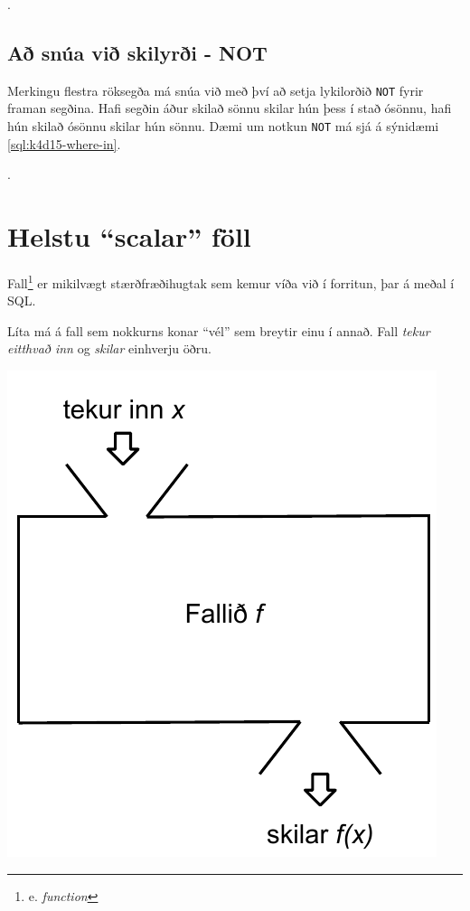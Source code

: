 \begin{example}
\caption[WHERE með IN]{Tvær \emph{SELECT} skipanir sem gera sama hlutinn. Þær finna báðar nemendurna með númerin 1, 3, 5 og 7. Seinni skipunin er þó töluvert skárri!}
\label{sql:k4d15-where-in}.
\centering
{}
\end{example}
\subsection{Að snúa við skilyrði - NOT}
Merkingu flestra röksegða má snúa við með því að setja lykilorðið \verb|NOT| fyrir framan segðina. Hafi segðin áður skilað sönnu skilar hún þess í stað ósönnu, hafi hún skilað ósönnu skilar hún sönnu. Dæmi um notkun \verb|NOT| má sjá á sýnidæmi \ref{sql:k4d15-where-in}.

\begin{example}
\caption[NOT lykilorðið]{\emph{SELECT} skipun sem finnur alla nemendur sem \emph{ekki} byrja á stafnum \emph{``K''}.}
\label{sql:k4d16-not}.
\centering
{}
\end{example}
\section{Helstu ``scalar'' föll}
\label{undirkafli:einindafoll}
Fall\footnote{e. \emph{function}} er mikilvægt stærðfræðihugtak sem kemur víða við í forritun, þar á meðal í SQL.

Líta má á fall sem nokkurns konar ``vél'' sem breytir einu í annað. Fall \emph{tekur eitthvað inn} og \emph{skilar} einhverju öðru.

\begin{marginfigure}
\caption[Fall]{Líta má á fall $f$ sem vél sem breytir gildinu $x$ í gildið $f(x)$.}
\label{mynd:fall}
\centering
\includegraphics[width=\linewidth]{myndir/fall}
\end{marginfigure}

